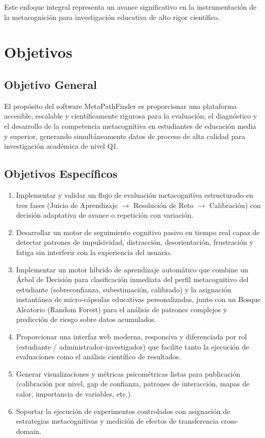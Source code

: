 \documentclass[11pt,a4paper]{article}
\begin{document}
Este enfoque integral representa un avance significativo en la instrumentación de la metacognición para investigación educativa de alto rigor científico.

\section{Objetivos}

\subsection{Objetivo General}

El propósito del software MetaPathFinder es proporcionar una plataforma accesible, escalable y científicamente rigurosa para la evaluación, el diagnóstico y el desarrollo de la competencia metacognitiva en estudiantes de educación media y superior, generando simultáneamente datos de proceso de alta calidad para investigación académica de nivel Q1.

\subsection{Objetivos Específicos}

\begin{enumerate}[leftmargin=*]
    \item Implementar y validar un flujo de evaluación metacognitiva estructurado en tres fases (Juicio de Aprendizaje $\rightarrow$ Resolución de Reto $\rightarrow$ Calibración) con decisión adaptativa de avance o repetición con variación.
    \item Desarrollar un motor de seguimiento cognitivo pasivo en tiempo real capaz de detectar patrones de impulsividad, distracción, desorientación, frustración y fatiga sin interferir con la experiencia del usuario.
    \item Implementar un motor híbrido de aprendizaje automático que combine un Árbol de Decisión para clasificación inmediata del perfil metacognitivo del estudiante (sobreconfianza, subestimación, calibrado) y la asignación instantánea de micro-cápsulas educativas personalizadas, junto con un Bosque Aleatorio (Random Forest) para el análisis de patrones complejos y predicción de riesgo sobre datos acumulados.
    \item Proporcionar una interfaz web moderna, responsiva y diferenciada por rol (estudiante / administrador-investigador) que facilite tanto la ejecución de evaluaciones como el análisis científico de resultados.
    \item Generar visualizaciones y métricas psicométricas listas para publicación (calibración por nivel, gap de confianza, patrones de interacción, mapas de calor, importancia de variables, etc.).
    \item Soportar la ejecución de experimentos controlados con asignación de estrategias metacognitivas y medición de efectos de transferencia cross-domain.
\end{enumerate}
\end{document}
